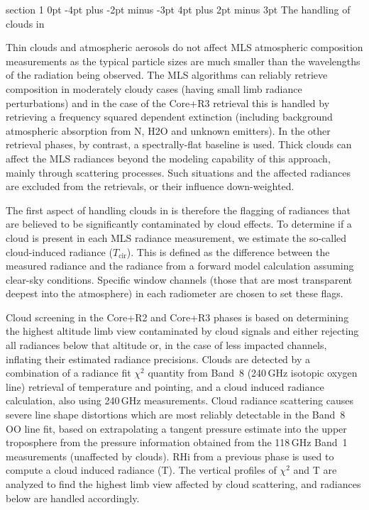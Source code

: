 \documentclass[11pt,draft]{report}
\makeatletter
\renewcommand{\section}{\@startsection%
  {section}%
  {1}%
  {0pt}%
  {-4pt plus -2pt minus -3pt}%
  {4pt plus 2pt minus 3pt}%
  {\Large\sffamily\fontseries{sb}\selectfont\flushleft\color{SectionColor}\figureversion{tabular}}}%
\makeatother
\begin{document}
\section{The handling of clouds in \thisv}
\label{sec:Clouds}
\newcommand{\Tcir}{\ensuremath{T_\text{cir}}}

Thin clouds and atmospheric aerosols do not affect MLS atmospheric
composition measurements as the typical particle sizes are much smaller
than the wavelengths of the radiation being observed. The MLS \thisv
algorithms can reliably retrieve composition in moderately cloudy cases
(having small limb radiance perturbations) and in the case of the
Core+R3 retrieval this is handled by retrieving a frequency squared
dependent extinction (including background atmospheric absorption from
N, H\cs2O and unknown emitters).  In the other retrieval phases, by
contrast, a spectrally-flat baseline is used.  Thick clouds can affect
the MLS radiances beyond the modeling capability of this approach,
mainly through scattering processes.  Such situations and the affected
radiances are excluded from the retrievals, or their influence
down-weighted.

The first aspect of handling clouds in \thisv is therefore the flagging
of radiances that are believed to be significantly contaminated by cloud
effects.  To determine if a cloud is present in each MLS radiance
measurement, we estimate the so-called cloud-induced radiance (\Tcir).
This is defined as the difference between the measured radiance and the
radiance from a forward model calculation assuming clear-sky conditions.
Specific window channels (those that are most transparent deepest into
the atmosphere) in each radiometer are chosen to set these flags.

Cloud screening in the Core+R2 and Core+R3 phases is based on
determining the highest altitude limb view contaminated by cloud signals
and either rejecting all radiances below that altitude or, in the case
of less impacted channels, inflating their estimated radiance
precisions.  Clouds are detected by a combination of a radiance fit
$\chi^2$ quantity from Band~8 (240\,GHz isotopic oxygen line) retrieval
of temperature and pointing, and a cloud induced radiance calculation,
also using 240\,GHz measurements.  Cloud radiance scattering causes
severe line shape distortions which are most reliably detectable in the
Band~8 OO line fit, based on extrapolating a tangent pressure
estimate into the upper troposphere from the pressure information
obtained from the 118\,GHz Band~1 measurements (unaffected by clouds).
RHi from a previous phase is used to compute a cloud induced radiance
(T).  The vertical profiles of $\chi^2$ and T are
analyzed to find the highest limb view affected by cloud scattering, and
radiances below are handled accordingly.
\end{document}
